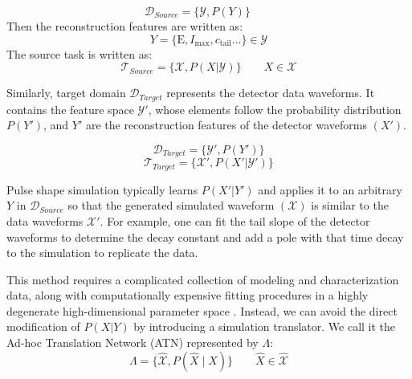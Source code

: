 \begin{equation}
    \mathcal{D}_{Source}=\{\mathcal{Y},P(Y)\}\qquad 
    \label{eqn:source_domain}
\end{equation}
Then the reconstruction features are written as:
 \begin{equation}
     Y=\{\mathrm{E},I_{\mathrm{max}},c_{\mathrm{tail}}...\}\in \mathcal{Y}
 \end{equation}
The source task is written as:
\begin{equation}
    \mathcal{T}_{Source}=\{\mathcal{X},P(X|\mathcal{Y})\} \qquad X\in \mathcal{X}
    \label{eqn:source_task}
\end{equation}

Similarly, target domain $\mathcal{D}_{Target}$ represents the detector data waveforms. It contains the feature space $\mathcal{Y'}$, whose elements follow the probability distribution $P(Y')$, and $Y'$ are the reconstruction features of the detector waveforms $(X')$.

\begin{equation}
\mathcal{D}_{Target}=\{\mathcal{Y}',P(Y')\}
\end{equation}
\begin{equation}
\mathcal{T}_{Target}=\{\mathcal{X}',P(X'|\mathcal{Y}')\}
\end{equation}

Pulse shape simulation typically learns $P(X'|Y')$ and applies it to an arbitrary $Y$ in $\mathcal{D}_{Source}$ so that the generated simulated waveform $(\mathcal{X})$ is similar to the data waveforms $\mathcal{X}'$. For example, one can fit the tail slope of the detector waveforms to determine the decay constant and add a pole with that time decay to the simulation to replicate the data. 

This method requires a complicated collection of modeling and characterization data, along with computationally expensive fitting procedures in a highly degenerate high-dimensional parameter space \cite{Ben_Thesis,Sam_Thesis}. Instead, we can avoid the direct modification of $P(X|Y)$ by introducing a simulation translator. We call it the Ad-hoc Translation Network (ATN) represented by $\Lambda$:
\begin{equation}
\Lambda = \{\hat{\mathcal{X}}, P(\hat{X}\mid X)\}\qquad \hat{X}\in \hat{\mathcal{X}}
\label{eqn:ATN}
\end{equation}

